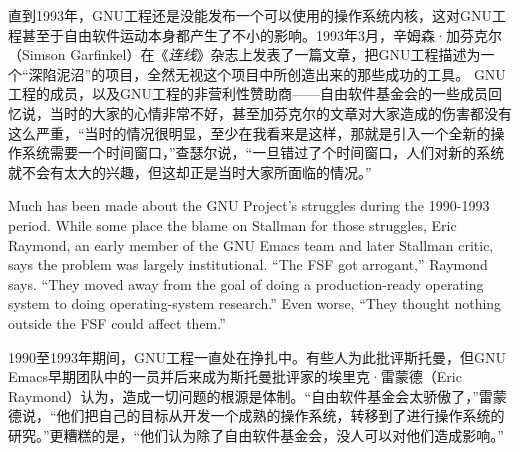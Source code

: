 \ifdefined\chs
直到1993年，GNU工程还是没能发布一个可以使用的操作系统内核，这对GNU工程甚至于自由软件运动本身都产生了不小的影响。1993年3月，辛姆森·加芬克尔（Simson Garfinkel）在《\textit{连线}》杂志上发表了一篇文章，把GNU工程描述为一个``深陷泥沼''的项目，全然无视这个项目中所创造出来的那些成功的工具。 GNU工程的成员，以及GNU工程的非营利性赞助商——自由软件基金会的一些成员回忆说，当时的大家的心情非常不好，甚至加芬克尔的文章对大家造成的伤害都没有这么严重，``当时的情况很明显，至少在我看来是这样，那就是引入一个全新的操作系统需要一个时间窗口，''查瑟尔说，``一旦错过了个时间窗口，人们对新的系统就不会有太大的兴趣，但这却正是当时大家所面临的情况。''
\fi

\ifdefined\eng
Much has been made about the GNU Project's struggles during the 1990-1993 period. While some place the blame on Stallman for those struggles, Eric Raymond, an early member of the GNU Emacs team and later Stallman critic, says the problem was largely institutional. ``The FSF got arrogant,'' Raymond says. ``They moved away from the goal of doing a production-ready operating system to doing operating-system research.'' Even worse, ``They thought nothing outside the FSF could affect them.''
\fi

\ifdefined\chs
1990至1993年期间，GNU工程一直处在挣扎中。有些人为此批评斯托曼，但GNU Emacs早期团队中的一员并后来成为斯托曼批评家的埃里克·雷蒙德（Eric Raymond）认为，造成一切问题的根源是体制。``自由软件基金会太骄傲了，''雷蒙德说，``他们把自己的目标从开发一个成熟的操作系统，转移到了进行操作系统的研究。''更糟糕的是，``他们认为除了自由软件基金会，没人可以对他们造成影响。''
\fi

